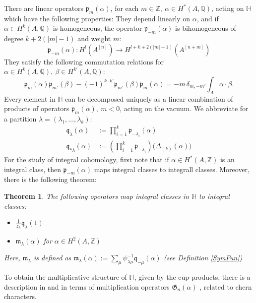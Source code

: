 \documentclass{amsart}
\newcommand{\hilb}[1]{^{[#1]}}
\newcommand{\vac}{|0\rangle}
\newcommand{\p}{\mathfrak{p}}
\renewcommand{\H}{\mathbb{H}}
\newcommand{\Q}{\mathbb{Q}}
\newcommand{\Z}{\mathbb{Z}}
\newcommand{\kq}{\mathfrak{q}}
\theoremstyle{plain}
\newtheorem{theorem}{Theorem}[section]
\theoremstyle{definition}
\theoremstyle{remark}
\begin{document}
There are linear operators $\p_m(\alpha)$, for each $m\in \Z,\ \alpha \in H^*(A,\Q)$, acting on $\H$ which have the following properties: They depend linearly on $\alpha$, and if $\alpha\in H^k(A,\Q)$ is homogeneous, the operator $\p_{-m}(\alpha)$ is bihomogeneous of degree $k+2(|m|-1)$ and weight $m$:
$$
\p_{-m}(\alpha) : H^l(A\hilb{n}) \rightarrow H^{l+k+2(|m|-1)}(A\hilb{n+m})
$$
They satisfy the following commutation relations for $\alpha\in H^k(A,\Q),\ \beta\in H^{k'}(A,\Q)$:
$$
\p_{m}(\alpha)\p_{m'}(\beta) - (-1)^{k\cdot k'}\p_{m'}(\beta)\p_{m}(\alpha) = -m\,\delta_{m,-m'} \int_A \alpha\cdot\beta.
$$
Every element in $\H$ can be decomposed uniquely as a linear combination of products of operators $\p_{m}(\alpha),\ m<0$, acting on the vacuum. 
We abbreviate for a partition $\lambda=(\lambda_1,\ldots ,\lambda_k)$: \begin{align}
\kq_\lambda(\alpha) & := \prod_{i=1}^k \p_{-\lambda_i}(\alpha) \\
\kq_{*\lambda}(\alpha) & := \left(\prod_{i=1}^k \p_{-\lambda_i}\right)\Big(\Delta_{(k)}(\alpha)\Big)
\end{align}
For the study of integral cohomology, first note that if $\alpha \in H^*(A,\Z)$ is an integral class, then $\p_{-m}(\alpha) $ maps integral classes to integrall classes. 
Moreover, there is the following theorem:
\begin{theorem} \cite{QinWang}
The following operators map integral classes in $\H$ to integral classes:
\begin{itemize}
\item $\frac{1}{z_\lambda}\kq_{\lambda}(1)$ 
\item $\mathfrak{m}_{\lambda}(\alpha)$ for $\alpha \in H^2(A,\Z)$ 
\end{itemize}
Here, $\mathfrak{m}_{\lambda}$ is defined as $\mathfrak{m}_{\lambda}(\alpha):=\sum_{\mu} \psi^{-1}_{\lambda\mu} \kq_{-\mu}(\alpha) $ (see Definition \ref{SymFun})
\end{theorem}

To obtain the multiplicative structure of $\H$, given by the cup-products, there is a description in \cite{LehnSorger} and \cite{LiQinWang} in terms of multiplication operators $\mathfrak{G}_n(\alpha)$ \cite[Def.~5.1]{LiQinWang}, related to chern characters. 
\end{document}
